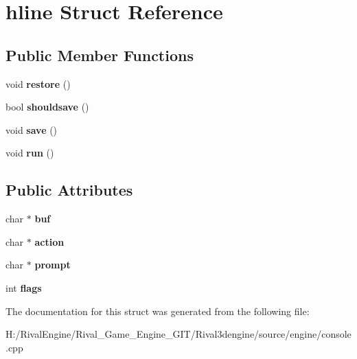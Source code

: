 \hypertarget{structhline}{}\section{hline Struct Reference}
\label{structhline}
\subsection*{Public Member Functions}
\begin{DoxyCompactItemize}
\item 
\mbox{\label{structhline_ad2a9ef66a6061ea45769648c808f034a}} 
void {\bfseries restore} ()
\item 
\mbox{\label{structhline_afe7c38d5d1b78f1b5b3fa5a2be7ef58e}} 
bool {\bfseries shouldsave} ()
\item 
\mbox{\label{structhline_a46879d386c77eaa14f750b2a87d9dfa8}} 
void {\bfseries save} ()
\item 
\mbox{\label{structhline_a73e39715f56187b48bb69d865a4eb18d}} 
void {\bfseries run} ()
\end{DoxyCompactItemize}
\subsection*{Public Attributes}
\begin{DoxyCompactItemize}
\item 
\mbox{\label{structhline_a3d5eb6c5052790925e02003e0896f920}} 
char $\ast$ {\bfseries buf}
\item 
\mbox{\label{structhline_af973bce10839b024a41054df855fa10a}} 
char $\ast$ {\bfseries action}
\item 
\mbox{\label{structhline_a466a5dc0d8578feadd710810deac243e}} 
char $\ast$ {\bfseries prompt}
\item 
\mbox{\label{structhline_ad6e9f92b194a27547e5fd435f58549f4}} 
int {\bfseries flags}
\end{DoxyCompactItemize}


The documentation for this struct was generated from the following file\+:\begin{DoxyCompactItemize}
\item 
H\+:/\+Rival\+Engine/\+Rival\+\_\+\+Game\+\_\+\+Engine\+\_\+\+G\+I\+T/\+Rival3dengine/source/engine/console.\+cpp\end{DoxyCompactItemize}
